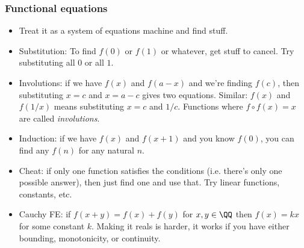 \documentclass[10pt,paper=letter]{scrartcl}
\begin{document}
\subsubsection*{Functional equations}

\begin{itemize}
  \item Treat it as a system of equations machine and find stuff.
  \item Substitution: To find $f(0)$ or $f(1)$ or whatever, get stuff to cancel. Try substituting all $0$ or all $1$.
  \item Involutions: if we have $f(x)$ and $f(a-x)$ and we're finding $f(c)$, then substituting $x = c$ and $x = a - c$ gives two equations. Similar: $f(x)$ and $f(1/x)$ means substituting $x = c$ and $1/c$. Functions where $f \circ f(x) = x$ are called \emph{involutions}.
  \item Induction: if we have $f(x)$ and $f(x+1)$ and you know $f(0)$, you can find any $f(n)$ for any natural $n$. 
  \item Cheat: if only one function satisfies the conditions (i.e. there's only one possible answer), then just find one and use that. Try linear functions, constants, etc.
  \item Cauchy FE: if $f(x+y) = f(x) + f(y)$ for $x, y \in \QQ$ then $f(x) = kx$ for some constant $k$. Making it reals is harder, it works if you have either bounding, monotonicity, or continuity.
\end{itemize}
\end{document}

